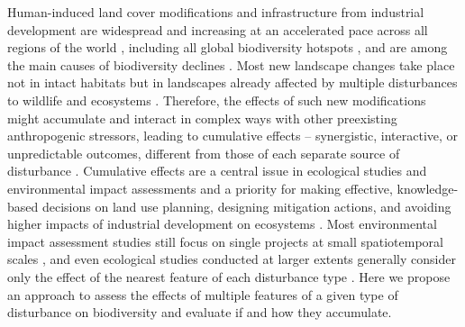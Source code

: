 \documentclass[titlepage]{article}
\begin{document}
Human-induced land cover modifications and infrastructure from industrial development are widespread and increasing at an accelerated pace across all regions of the world \citep{venter_sixteen_2016,ibisch_global_2016}, including all global biodiversity hotspots \citep{sloan_remaining_2014}, and are among the main causes of biodiversity declines \citep{benitez-lopez_impacts_2010,newbold_global_2015}. Most new landscape changes take place not in intact habitats but in landscapes already affected by multiple disturbances to wildlife and ecosystems \citep{barber_roads_2014}. Therefore, the effects of such new modifications might accumulate and interact in complex ways with other preexisting anthropogenic stressors, leading to cumulative effects \citep[Box 1; ][]{gillingham_integration_2016} -- synergistic, interactive, or unpredictable outcomes, different from those of each separate source of disturbance \citep{naugle_unifying_2011}. 
Cumulative effects are a central issue in ecological studies and environmental impact assessments and a priority for making effective, knowledge-based decisions on land use planning, designing mitigation actions, and avoiding higher impacts of industrial development on ecosystems \citep{gillingham_integration_2016, laurance_roads_2017}. Most environmental impact assessment studies still focus on single projects at small spatiotemporal scales \citep{johnson_regulating_2011}, and even ecological studies conducted at larger extents generally consider only the effect of the nearest feature of each disturbance type \citep[e.g.][]{torres_assessing_2016}. Here we propose an approach to assess the effects of multiple features of a given type of disturbance on biodiversity and evaluate if and how they accumulate. 

\end{document}
